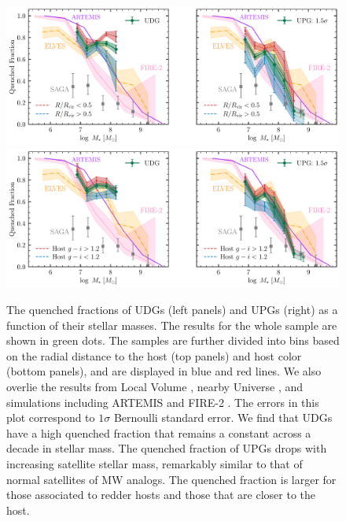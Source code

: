 \documentclass[twocolumn,astrosymb,twocolappendix]{aastex631}
\begin{document}
\begin{CJK*}{UTF8}{gbsn}
\begin{figure}
	\vbox{ 
		\centering
		\includegraphics[width=1\linewidth]{quenched_frac_dist2host.pdf}
		\includegraphics[width=1\linewidth]{quenched_frac_host_color.pdf}
	}
    \caption{The quenched fractions of UDGs (left panels) and UPGs (right) as a function of their stellar masses. The results for the whole sample are shown in green dots. The samples are further divided into bins based on the radial distance to the host (top panels) and host color (bottom panels), and are displayed in blue and red lines. We also overlie the results from Local Volume \citep[ELVES,][]{CarlstenELVES2022}, nearby Universe \citep[SAGA,][]{SAGA-II}, and simulations including ARTEMIS \citep{Font2022} and FIRE-2 \citep{Samuel2022}. The errors in this plot correspond to $1\sigma$ Bernoulli standard error. We find that UDGs have a high quenched fraction that remains a constant across a decade in stellar mass. The quenched fraction of UPGs drops with increasing satellite stellar mass, remarkably similar to that of normal satellites of MW analogs. The quenched fraction is larger for those associated to redder hosts and those that are closer to the host. }
    \label{fig:qfrac}
\end{figure}


\end{CJK*}
\end{document}
